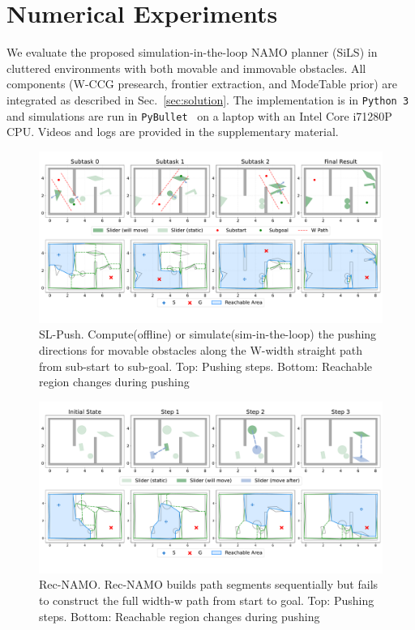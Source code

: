 \section{Numerical Experiments}
\label{sec:experiments}
We evaluate the proposed simulation-in-the-loop NAMO planner (SiLS)
in cluttered environments with both movable and immovable obstacles.
All components (W-CCG presearch, frontier extraction, and ModeTable prior)
are integrated as described in Sec.~\ref{sec:solution}.
The implementation is in \texttt{Python~3} and simulations are run in
\texttt{PyBullet}~\cite{coumans2019} on a laptop with an Intel
Core i7\textendash1280P CPU. Videos and logs are provided in the
supplementary material.
\begin{figure}
  \centering
  \includegraphics[width=\columnwidth]{figures/SL_Push.pdf}
  \vspace{-10mm}
\caption{SL-Push. Compute(offline) or simulate(sim-in-the-loop) the pushing directions for movable obstacles along the W-width straight path from sub-start to sub-goal. Top: Pushing steps. Bottom: Reachable region changes during pushing}
\end{figure}

\begin{figure}
  \centering
  \vspace{-3mm}
  \includegraphics[width=\columnwidth]{figures/Rec_NAMO.pdf}
  \vspace{-10mm}
\caption{Rec-NAMO. Rec-NAMO builds path segments sequentially but fails to construct the full width-w path from start to goal. Top: Pushing steps. Bottom: Reachable region changes during pushing}
\end{figure}



